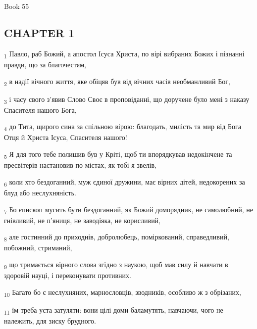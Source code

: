 Book 55
\subsection{CHAPTER 1}
\begin{tcolorbox}
\textsubscript{1} Павло, раб Божий, а апостол Ісуса Христа, по вірі вибраних Божих і пізнанні правди, що за благочестям,
\end{tcolorbox}
\begin{tcolorbox}
\textsubscript{2} в надії вічного життя, яке обіцяв був від вічних часів необманливий Бог,
\end{tcolorbox}
\begin{tcolorbox}
\textsubscript{3} і часу свого з'явив Слово Своє в проповіданні, що доручене було мені з наказу Спасителя нашого Бога,
\end{tcolorbox}
\begin{tcolorbox}
\textsubscript{4} до Тита, щирого сина за спільною вірою: благодать, милість та мир від Бога Отця й Христа Ісуса, Спасителя нашого!
\end{tcolorbox}
\begin{tcolorbox}
\textsubscript{5} Я для того тебе полишив був у Кріті, щоб ти впорядкував недокінчене та пресвітерів настановив по містах, як тобі я звелів,
\end{tcolorbox}
\begin{tcolorbox}
\textsubscript{6} коли хто бездоганний, муж єдиної дружини, має вірних дітей, недокорених за блуд або неслухняність.
\end{tcolorbox}
\begin{tcolorbox}
\textsubscript{7} Бо єпископ мусить бути бездоганний, як Божий доморядник, не самолюбний, не гнівливий, не п'яниця, не заводіяка, не корисливий,
\end{tcolorbox}
\begin{tcolorbox}
\textsubscript{8} але гостинний до приходнів, добролюбець, поміркований, справедливий, побожний, стриманий,
\end{tcolorbox}
\begin{tcolorbox}
\textsubscript{9} що тримається вірного слова згідно з наукою, щоб мав силу й навчати в здоровій науці, і переконувати противних.
\end{tcolorbox}
\begin{tcolorbox}
\textsubscript{10} Багато бо є неслухняних, марнословців, зводників, особливо ж з обрізаних,
\end{tcolorbox}
\begin{tcolorbox}
\textsubscript{11} їм треба уста затуляти: вони цілі доми баламутять, навчаючи, чого не належить, для зиску брудного.
\end{tcolorbox}
